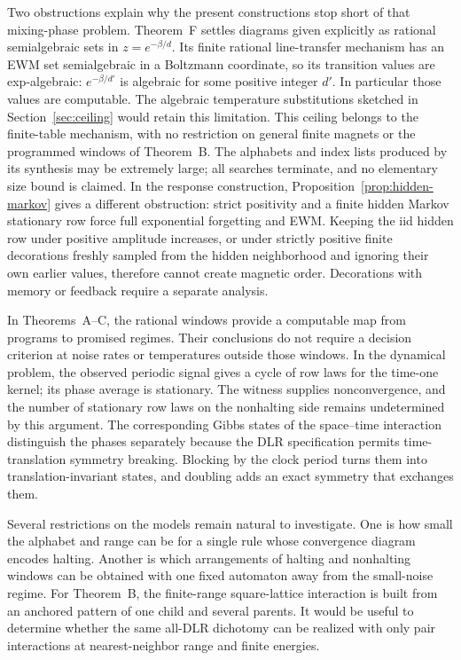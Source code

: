 Two obstructions explain why the present constructions stop short of that mixing-phase problem. Theorem~F settles diagrams given explicitly as rational semialgebraic sets in \(z=e^{-\beta/d}\). Its finite rational line-transfer mechanism has an EWM set semialgebraic in a Boltzmann coordinate, so its transition values are exp-algebraic: \(e^{-\beta/d'}\) is algebraic for some positive integer \(d'\). In particular those values are computable. The algebraic temperature substitutions sketched in Section~\ref{sec:ceiling} would retain this limitation. This ceiling belongs to the finite-table mechanism, with no restriction on general finite magnets or the programmed windows of Theorem~B. The alphabets and index lists produced by its synthesis may be extremely large; all searches terminate, and no elementary size bound is claimed. In the response construction, Proposition~\ref{prop:hidden-markov} gives a different obstruction: strict positivity and a finite hidden Markov stationary row force full exponential forgetting and EWM. Keeping the iid hidden row under positive amplitude increases, or under strictly positive finite decorations freshly sampled from the hidden neighborhood and ignoring their own earlier values, therefore cannot create magnetic order. Decorations with memory or feedback require a separate analysis.

In Theorems~A--C, the rational windows provide a computable map from programs to promised regimes. Their conclusions do not require a decision criterion at noise rates or temperatures outside those windows. In the dynamical problem, the observed periodic signal gives a cycle of row laws for the time-one kernel; its phase average is stationary. The witness supplies nonconvergence, and the number of stationary row laws on the nonhalting side remains undetermined by this argument. The corresponding Gibbs states of the space--time interaction distinguish the phases separately because the DLR specification permits time-translation symmetry breaking. Blocking by the clock period turns them into translation-invariant states, and doubling adds an exact symmetry that exchanges them.

Several restrictions on the models remain natural to investigate. One is how small the alphabet and range can be for a single rule whose convergence diagram encodes halting. Another is which arrangements of halting and nonhalting windows can be obtained with one fixed automaton away from the small-noise regime. For Theorem~B, the finite-range square-lattice interaction is built from an anchored pattern of one child and several parents. It would be useful to determine whether the same all-DLR dichotomy can be realized with only pair interactions at nearest-neighbor range and finite energies.


